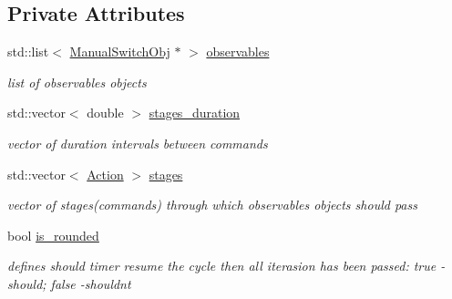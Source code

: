 \subsection*{Private Attributes}
\begin{DoxyCompactItemize}
\item 
\mbox{\label{class_timer_acf215281063a8be431d810725a804224}} 
std\+::list$<$ \hyperlink{class_manual_switch_obj}{Manual\+Switch\+Obj} $\ast$ $>$ \hyperlink{class_timer_acf215281063a8be431d810725a804224}{observables}
\begin{DoxyCompactList}\small\item\em list of observables objects \end{DoxyCompactList}\item 
\mbox{\label{class_timer_a77e0f14caf59087a0afa9e466b3b8c4b}} 
std\+::vector$<$ double $>$ \hyperlink{class_timer_a77e0f14caf59087a0afa9e466b3b8c4b}{stages\+\_\+duration}
\begin{DoxyCompactList}\small\item\em vector of duration intervals between commands \end{DoxyCompactList}\item 
\mbox{\label{class_timer_a8f8c7d41223e9976d4588ef212286fb5}} 
std\+::vector$<$ \hyperlink{_manual_switch_obj_8h_a8bb1ef53467e4f61410d12822d922498}{Action} $>$ \hyperlink{class_timer_a8f8c7d41223e9976d4588ef212286fb5}{stages}
\begin{DoxyCompactList}\small\item\em vector of stages(commands) through which observables objects should pass \end{DoxyCompactList}\item 
\mbox{\label{class_timer_ac397f8917b155e12401dd9ab793c91d9}} 
bool \hyperlink{class_timer_ac397f8917b155e12401dd9ab793c91d9}{is\+\_\+rounded}
\begin{DoxyCompactList}\small\item\em defines should timer resume the cycle then all iterasion has been passed\+: \textquotesingle{}true\textquotesingle{} -\/ should; \textquotesingle{}false\textquotesingle{} -\/shouldn\textquotesingle{}t \end{DoxyCompactList}\item 
\mbox{\label{class_timer_a6f1066d49764f5fc746f5fd669d95a9f}} 

\end{DoxyCompactItemize}

